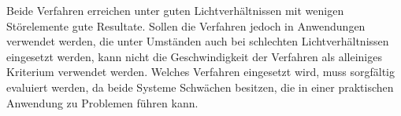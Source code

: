 Beide Verfahren erreichen unter guten Lichtverhältnissen mit wenigen Störelemente gute Resultate. Sollen die Verfahren
 jedoch in Anwendungen verwendet werden, die unter Umständen auch bei schlechten Lichtverhältnissen eingesetzt werden,
 kann nicht die Geschwindigkeit der Verfahren als alleiniges Kriterium verwendet werden. Welches Verfahren eingesetzt
 wird, muss sorgfältig evaluiert werden, da beide Systeme Schwächen besitzen, die in einer praktischen Anwendung zu
 Problemen führen kann.

